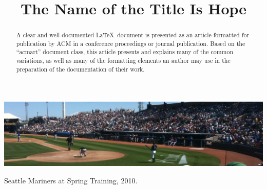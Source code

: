 
\title{The Name of the Title Is Hope} %

\begin{abstract}
  A clear and well-documented \LaTeX\ document is presented as an article formatted for publication by ACM in a conference proceedings or journal publication. Based on the ``acmart'' document class, this article presents and explains many of the common variations, as well as many of the formatting elements an author may use in the preparation of the documentation of their work.
\end{abstract}


\begin{teaserfigure}
  \includegraphics[width=\textwidth]{sampleteaser}
  \caption{Seattle Mariners at Spring Training, 2010.}
  \label{fig:teaser}
\end{teaserfigure}


\maketitle

